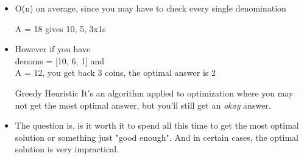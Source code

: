 \documentclass[11pt]{article}
\begin{document}
\begin{itemize}
\item O(n) on average, since you may have to check every single denomination
\item[{A = 18}] gives 10, 5, 3x1s
\item However if you have \\
denoms = [10, 6, 1] and \\
A = 12, you get back 3 coins, the optimal answer is 2
\item[{Greedy Heuristic}] It's an algorithm applied to optimization where you may not get the most optimal answer, but you'll still get an \emph{okay} answer.
\item The question is, is it worth it to spend all this time to get the most optimal solution or something just "good enough". And in certain cases, the optimal solution is very impractical.
\end{itemize}
\end{document}
